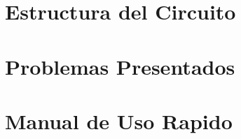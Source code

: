 \documentclass{article}
\begin{document}
    
\section{Estructura del Circuito}
\label{circuito}
    \begin{flushleft}
        
    \end{flushleft}
    
\section{Problemas Presentados}
\label{problemas}
    \begin{flushleft}
        
    \end{flushleft}
    
\section{Manual de Uso Rapido}
\label{manual}
    \begin{flushleft}
        
    \end{flushleft}

\vfill

\end{document}
